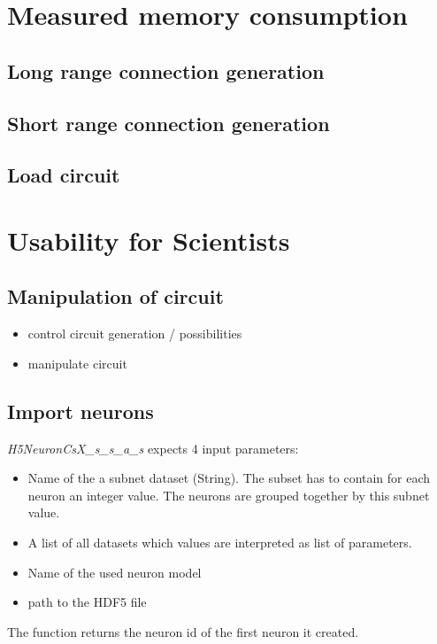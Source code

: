 \section{Measured memory consumption}

\subsection{Long range connection generation}



\subsection{Short range connection generation}
\subsection{Load circuit}

\newpage
\section{Usability for Scientists}

\subsection{Manipulation of circuit}

\begin{itemize}
      \item control circuit generation / possibilities
      \item  manipulate circuit
\end{itemize}

\subsection{Import neurons}
\emph{H5NeuronCsX\_s\_s\_a\_s} expects 4 input parameters:
\begin{itemize}
      \item Name of the a subnet dataset (String).
The subset has to contain for each neuron an integer value.
The neurons are grouped together by this subnet value.

      \item A list of all datasets which values are interpreted as list of parameters.
      
      \item Name of the used neuron model
      
      \item path to the HDF5 file 
\end{itemize}
The function returns the neuron id of the first neuron it created.

